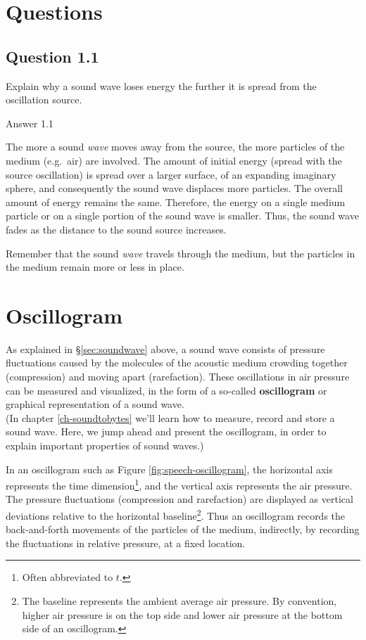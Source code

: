 \documentclass[
]{book}
\begin{document}
\label{questions-soundwaves}
\section*{Questions}\label{questions-1}

\subsection*{Question 1.1}\label{question-1.1}

Explain why a sound wave loses energy the further it is spread from the oscillation source.

Answer 1.1

The more a sound \emph{wave} moves away from the source, the more particles of the medium (e.g.~air) are involved. The amount of initial energy (spread with the source oscillation) is spread over a larger surface, of an expanding imaginary sphere, and consequently the sound wave displaces more particles. The overall amount of energy remains the same. Therefore, the energy on a single medium particle or on a single portion of the sound wave is smaller. Thus, the sound wave fades as the distance to the sound source increases.

Remember that the sound \emph{wave} travels through the medium, but the particles in the medium remain more or less in place.

\section{Oscillogram}\label{sec:oscillogram}

As explained in §\ref{sec:soundwave} above, a sound wave consists of pressure fluctuations caused by the molecules of the acoustic medium crowding together (compression) and moving apart (rarefaction). These oscillations in air pressure can be measured and visualized, in the form of a so-called \textbf{oscillogram} or graphical representation of a sound wave.\\
(In chapter \ref{ch-soundtobytes} we'll learn how to measure, record and store a sound wave. Here, we jump ahead and present the oscillogram, in order to explain important properties of sound waves.)

In an oscillogram such as Figure \ref{fig:speech-oscillogram}, the horizontal axis represents the time dimension\footnote{Often abbreviated to \(t\).}, and the vertical axis represents the air pressure. The pressure fluctuations (compression and rarefaction) are displayed as vertical deviations relative to the horizontal baseline\footnote{The baseline represents the ambient average air pressure. By convention, higher air pressure is on the top side and lower air pressure at the bottom side of an oscillogram.}.
Thus an oscillogram records the back-and-forth movements of the particles of the medium, indirectly, by recording the fluctuations in relative pressure, at a fixed location.
\end{document}
